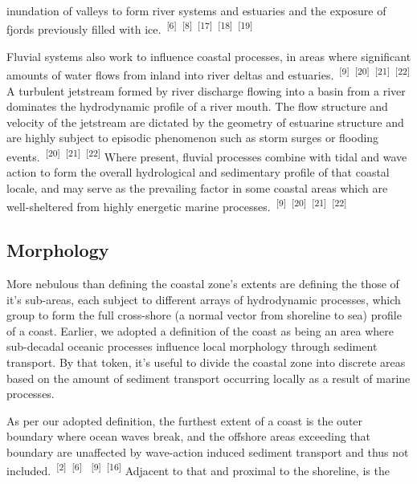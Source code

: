 \documentclass{article}
\begin{document}
\newpage

\par{\noindent inundation of valleys to form river systems and estuaries and the exposure of fjords previously filled with ice.~\textsuperscript{[6]}~\textsuperscript{[8]}~\textsuperscript{[17]}~\textsuperscript{[18]}~\textsuperscript{[19]}}

\par{Fluvial systems also work to influence coastal processes, in areas where significant amounts of water flows from inland into river deltas and estuaries.~\textsuperscript{[9]}~\textsuperscript{[20]}~\textsuperscript{[21]}~\textsuperscript{[22]} A turbulent jetstream formed by river discharge flowing into a basin from a river dominates the hydrodynamic profile of a river mouth. The flow structure and velocity of the jetstream are dictated by the geometry of estuarine structure and are highly subject to episodic phenomenon such as storm surges or flooding events.~\textsuperscript{[20]}~\textsuperscript{[21]}~\textsuperscript{[22]} Where present, fluvial processes combine with tidal and wave action to form the overall hydrological and sedimentary profile of that coastal locale, and may serve as the prevailing factor in some coastal areas which are well-sheltered from highly energetic marine processes.~\textsuperscript{[9]}~\textsuperscript{[20]}~\textsuperscript{[21]}~\textsuperscript{[22]}}

\subsection{Morphology}

\par{\hspace{.5cm}More nebulous than defining the coastal zone's extents are defining the those of it's sub-areas, each subject to different arrays of hydrodynamic processes, which group to form the full cross-shore (a normal vector from shoreline to sea) profile of a coast. Earlier, we adopted a definition of the coast as being an area where sub-decadal oceanic processes influence local morphology through sediment transport. By that token, it's useful to divide the coastal zone into discrete areas based on the amount of sediment transport occurring locally as a result of marine processes.} 

\par{As per our adopted definition, the furthest extent of a coast is the outer boundary where ocean waves break, and the offshore areas exceeding that boundary are unaffected by wave-action induced sediment transport and thus not included.~\textsuperscript{[2]}~\textsuperscript{[6]}  ~\textsuperscript{[9]}~\textsuperscript{[16]} Adjacent to that and proximal to the shoreline, is the}
\end{document}
